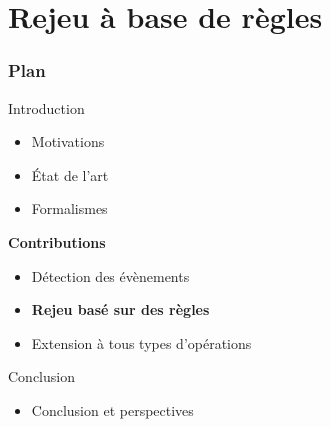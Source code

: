 \documentclass[aspectratio=1610]{beamer}
\begin{document}
\section[Rejeu]{Rejeu à base de règles}
\begin{frame}
	\frametitle{Plan}
	\centering
	\begin{minipage}{\textwidth}
		\raggedright
		\begin{minipage}{.55\textwidth}
			\begin{mytocblock}{Introduction}
				\begin{itemize}
					\item[] Motivations
					\item[] État de l'art
					\item[] Formalismes
				\end{itemize}
			\end{mytocblock}
		\end{minipage}

		\vspace{1em}

		\begin{minipage}{.55\textwidth}
			\begin{mytocblock}{\textbf{Contributions}}
				\begin{itemize}
					\item[] Détection des évènements
					\item[] \textbf{Rejeu basé sur des règles}
					\item[] Extension à tous types d'opérations
				\end{itemize}
			\end{mytocblock}
		\end{minipage}

		\vspace{1em}

		\begin{minipage}{.55\textwidth}
			\begin{mytocblock}{Conclusion}
				\begin{itemize}
					\item[] Conclusion et perspectives
				\end{itemize}
			\end{mytocblock}
		\end{minipage}
	\end{minipage}
\end{frame}

\end{document}
